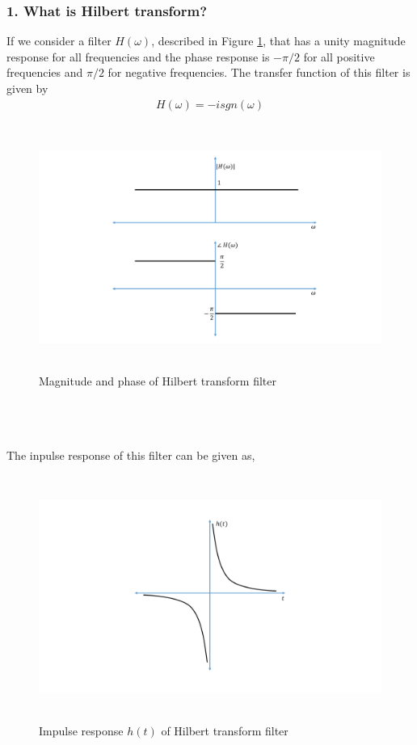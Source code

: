 \subsubsection{1. What is Hilbert transform?}
If we consider a filter $H(\omega)$, described in Figure \ref{Hilbert_Transformer}, that has a unity magnitude response for all frequencies and the phase response is $-\pi/2$ for all positive frequencies and $\pi/2$ for negative frequencies. The transfer function of this filter is given by
\begin{equation}
\begin{split}
H(\omega)=-isgn(\omega)
\end{split}
\label{}
\end{equation}
\begin{figure}[h]
	\centering
	\includegraphics[width=1.0\textwidth, height=8cm]{./sdf/simplified_coherent_receiver/figures/HT.pdf}
	\caption{Magnitude and phase of Hilbert transform filter}\label{Hilbert_Transformer}
\end{figure}
\\
\\
\\
The inpulse response of this filter can be given as,

\begin{figure}[h]
	\centering
	\includegraphics[width=1.0\textwidth, height=8cm]{./sdf/simplified_coherent_receiver/figures/Impulse_Response.pdf}
	\caption{Impulse response $h(t)$ of Hilbert transform filter}\label{Impulse_Response}
\end{figure}

